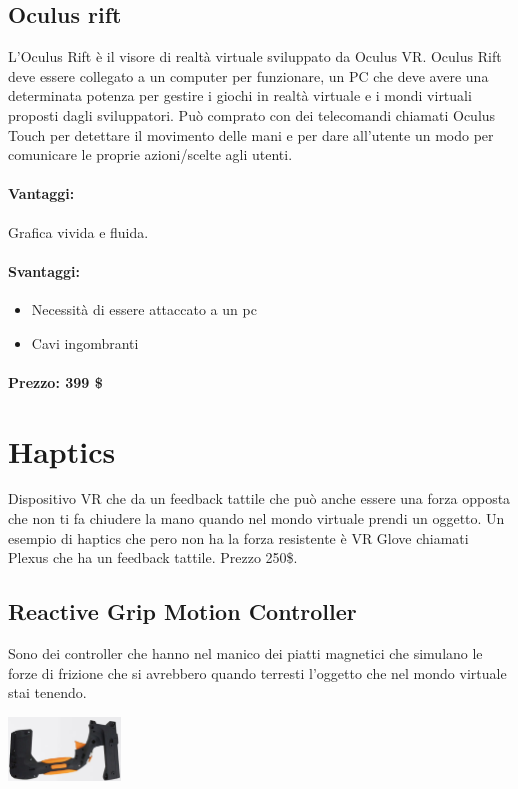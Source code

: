 \documentclass[8pt]{extarticle}
\begin{document}
\begin{multicols}{3}
\subsection{Oculus rift}
L'Oculus Rift è il visore di realtà virtuale sviluppato da Oculus VR. Oculus Rift deve essere collegato a un computer per funzionare, un PC che deve avere una determinata potenza per gestire i giochi in realtà virtuale e i mondi virtuali proposti dagli sviluppatori. 
Può comprato con dei telecomandi chiamati Oculus Touch per detettare il movimento delle mani e per dare all’utente un modo per comunicare le proprie azioni/scelte agli utenti.
\paragraph{Vantaggi:}Grafica vivida e fluida.
\paragraph{Svantaggi:}
\begin{itemize}
    \item Necessità di essere attaccato a un pc
    \item Cavi ingombranti
\end{itemize}
\paragraph{Prezzo: 399 \$}
\section{Haptics}
Dispositivo VR che da un feedback tattile che può anche essere una forza opposta che non ti fa chiudere la mano quando nel mondo virtuale prendi un oggetto.
Un esempio di haptics che pero non ha la forza resistente è VR Glove chiamati Plexus che ha un feedback tattile. Prezzo 250\$.
\subsection{Reactive Grip Motion Controller}
Sono dei controller che hanno nel manico dei piatti magnetici che simulano le forze di frizione che si avrebbero quando terresti l'oggetto che nel mondo virtuale stai tenendo.
\begin{center}
    \begin{minipage}{\columnwidth}
        \centering
        \includegraphics[width=3cm]{reactiveGrip.png}
    \end{minipage}
\end{center}

\end{multicols}
\end{document}
